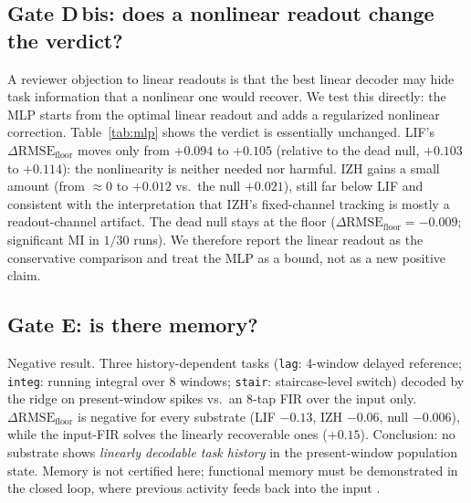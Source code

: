 \documentclass[10pt,a4paper]{article}
\newcommand{\RMSE}{\ensuremath{\mathrm{RMSE}}}
\newcommand{\MI}{\ensuremath{\mathrm{MI}}}
\newcommand{\dfloor}{\ensuremath{\Delta\RMSE_{\mathrm{floor}}}}
\begin{document}
\subsection{Gate D\,bis: does a nonlinear readout change the verdict?}\label{sec:gatedbis}
\begin{table}[H]
\centering
\caption{Gate D\,bis: same spikes and splits as Gate D, with a small
MLP residual readout on top of the cross-validated ridge. $\dfloor$
is the improvement over the mean-predictor floor; ``MI-sig'' is the
fraction of runs with significant $\MI$ (30 runs).}
\label{tab:mlp}

\end{table}
A reviewer objection to linear readouts is that the best linear decoder
may hide task information that a nonlinear one would recover. We test
this directly: the MLP starts from the optimal linear readout and adds a
regularized nonlinear correction. Table~\ref{tab:mlp} shows the verdict
is essentially unchanged. LIF's $\dfloor$ moves only from $+0.094$ to
$+0.105$ (relative to the dead null, $+0.103$ to $+0.114$): the
nonlinearity is neither needed nor harmful. IZH gains a small amount
(from $\approx0$ to $+0.012$ vs.\ the null $+0.021$), still far below
LIF and consistent with the interpretation that IZH's fixed-channel
tracking is mostly a readout-channel artifact. The dead null stays at
the floor ($\dfloor=-0.009$; significant $\MI$ in $1/30$ runs). We
therefore report the linear readout as the conservative comparison and
treat the MLP as a bound, not as a new positive claim.

\subsection{Gate E: is there memory?}\label{sec:gateeres}
\begin{table}[H]
\centering
\caption{Gate E: RMSE improvement over the mean-predictor floor,
$\dfloor$\ (ridge minus floor), per profile, plus the input-only
8-tap FIR reference (positive \emph{floor} values).}
\label{tab:gatee}

\end{table}
Negative result. Three history-dependent tasks (\texttt{lag}:
4-window delayed reference; \texttt{integ}: running integral over
$8$ windows; \texttt{stair}: staircase-level switch) decoded by the
ridge on present-window spikes vs.\ an $8$-tap FIR over the input only.
$\dfloor$ is negative for every substrate
(LIF $-0.13$, IZH $-0.06$, null $-0.006$), while the input-FIR solves
the linearly recoverable ones ($+0.15$). Conclusion: no substrate shows
\emph{linearly decodable task history} in the present-window population
state. Memory is not certified here; functional memory must be
demonstrated in the closed loop, where previous activity feeds back
into the input \cite{carmena2003,nicolelis2003}.
\end{document}
